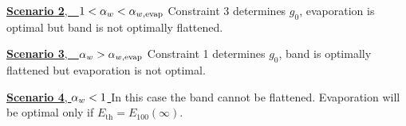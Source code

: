 \vspace{-2em}
\begin{myblock} 
  \underline{\textbf{Scenario 2},~~$ 1 <  \alpha_{w}  <  \alpha_{w,\text{evap}} $} \newline
Constraint 3 determines $g_{0}$,  evaporation is optimal but band is not
optimally flattened.  
\end{myblock} 

\vspace{-2em}
\begin{myblock} 
 \underline{ \textbf{Scenario 3},~~$ \alpha_{w}  >  \alpha_{w,\text{evap}} $} \newline  Constraint
1 determines $g_{0}$,  band is optimally flattened but evaporation is not
optimal.
\end{myblock} 

\vspace{-2em}
\begin{myblock} 
  \underline{ \textbf{Scenario 4}, $ \alpha_{w}  < 1 $ } \newline  In this case the band cannot be flattened.   Evaporation will be optimal only if  $E_{\text{th}} = E_{100}(\infty)$.
\end{myblock} 


